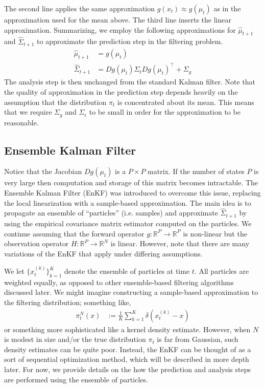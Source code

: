 \documentclass[12pt]{article}
\newcommand{\R}{\mathbb{R}}
\begin{document}
 The second line applies the same approximation $g(x_t) \approx g(\mu_t)$ as in the approximation used for the mean above. The third line inserts the linear approximation.
 Summarizing, we employ the following approximations for $\hat{\mu}_{t + 1}$ and $\hat{\Sigma}_{t + 1}$ to approximate the prediction step in the filtering problem. 
 \begin{align}
 \hat{\mu}_{t + 1} &= g(\mu_t) \label{ExKF_approximations} \\
 \hat{\Sigma}_{t + 1} &= Dg(\mu_t) \Sigma_t Dg(\mu_t)^\top + \Sigma_g \nonumber
 \end{align} 
The analysis step is then unchanged from the standard Kalman filter. Note that the quality of approximation in the prediction step depends heavily on the assumption that 
the distribution $\pi_t$ is concentrated about its mean. This means that we require $\Sigma_g$ and $\Sigma_{\epsilon}$ to be small in order for the approximation to 
be reasonable. 

\subsection{Ensemble Kalman Filter}
Notice that the Jacobian $Dg(\mu_t)$ is a $P \times P$ matrix. If the number of states $P$ is very large then computation and storage of this matrix becomes 
intractable. The Ensemble Kalman Filter (EnKF) was introduced to overcome this issue, replacing the local linearization with a sample-based approximation. 
The main idea is to propagate an ensemble of ``particles'' (i.e. samples) and approximate $\hat{\Sigma}_{t + 1}$ by using the empirical covariance matrix estimator 
computed on the particles. We continue assuming that the forward operator $g: \R^P \to \R^P$ is non-linear but the observation operator $H: \R^P \to \R^N$ is 
linear. However, note that there are many variations of the EnKF that apply under differing assumptions. 

We let $\{x_t^{(k)}\}_{k = 1}^{K}$ denote the ensemble of particles at time $t$. All particles are weighted equally, as opposed to other ensemble-based filtering 
algorithms discussed later. We might imagine constructing a sample-based approximation to the filtering distribution; something like, 
\begin{align*}
\pi_t^{N}(x) &:= \frac{1}{K} \sum_{k = 1}^{K} \delta(x_t^{(k)} - x)
\end{align*}
or something more sophisticated like a kernel density estimate. However, when $N$ is modest in size and/or the true distribution $\pi_t$ is far from Gaussian, 
such density estimates can be quite poor. Instead, the EnKF can be thought of as a sort of sequential optimization method, which will be described in more depth 
later. For now, we provide details on the how the prediction and analysis steps are performed using the ensemble of particles. 
\end{document}
